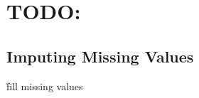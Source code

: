 \chapter{TODO:}

\section{Imputing Missing Values}
\label{appendix:imputing_missing_values}

\r{fill missing values}



